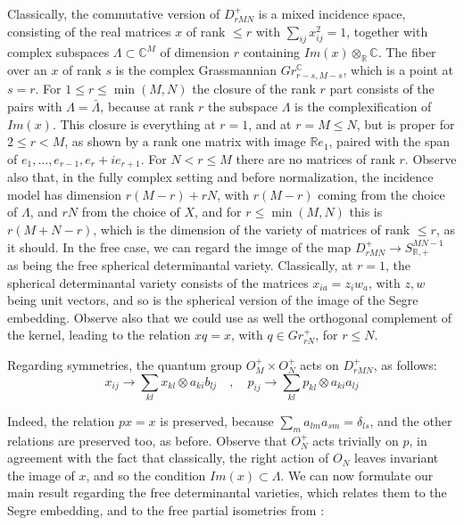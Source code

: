 \documentclass[11pt]{article}
\theoremstyle{plain}
\begin{document}
Classically, the commutative version of $D^+_{rMN}$ is a mixed incidence space, consisting of the real matrices $x$ of rank $\leq r$ with $\sum_{ij}x_{ij}^2=1$, together with complex subspaces $\Lambda\subset\mathbb C^M$ of dimension $r$ containing $Im(x)\otimes_\mathbb R\mathbb C$. The fiber over an $x$ of rank $s$ is the complex Grassmannian $Gr^\mathbb C_{r-s,M-s}$, which is a point at $s=r$. For $1\leq r\leq\min(M,N)$ the closure of the rank $r$ part consists of the pairs with $\Lambda=\bar{\Lambda}$, because at rank $r$ the subspace $\Lambda$ is the complexification of $Im(x)$. This closure is everything at $r=1$, and at $r=M\leq N$, but is proper for $2\leq r<M$, as shown by a rank one matrix with image $\mathbb Re_1$, paired with the span of $e_1,\ldots,e_{r-1},e_r+ie_{r+1}$. For $N<r\leq M$ there are no matrices of rank $r$. Observe also that, in the fully complex setting and before normalization, the incidence model has dimension $r(M-r)+rN$, with $r(M-r)$ coming from the choice of $\Lambda$, and $rN$ from the choice of $X$, and for $r\leq\min(M,N)$ this is $r(M+N-r)$, which is the dimension of the variety of matrices of rank $\leq r$, as it should. In the free case, we can regard the image of the map $D^+_{rMN}\to S^{MN-1}_{\mathbb R,+}$ as being the free spherical determinantal variety. Classically, at $r=1$, the spherical determinantal variety consists of the matrices $x_{ia}=z_iw_a$, with $z,w$ being unit vectors, and so is the spherical version of the image of the Segre embedding. Observe also that we could use as well the orthogonal complement of the kernel, leading to the relation $xq=x$, with $q\in Gr^+_{rN}$, for $r\leq N$.

\bigskip

Regarding symmetries, the quantum group $O_M^+\times O_N^+$ acts on $D^+_{rMN}$, as follows:
$$x_{ij}\to\sum_{kl}x_{kl}\otimes a_{ki}b_{lj}\quad,\quad
p_{ij}\to\sum_{kl}p_{kl}\otimes a_{ki}a_{lj}$$

Indeed, the relation $px=x$ is preserved, because $\sum_ma_{lm}a_{sm}=\delta_{ls}$, and the other relations are preserved too, as before. Observe that $O_N^+$ acts trivially on $p$, in agreement with the fact that classically, the right action of $O_N$ leaves invariant the image of $x$, and so the condition $Im(x)\subset\Lambda$. We can now formulate our main result regarding the free determinantal varieties, which relates them to the Segre embedding, and to the free partial isometries from \cite{ba1}:
\end{document}
